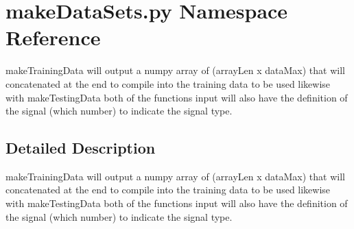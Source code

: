 \section{make\+Data\+Sets.\+py Namespace Reference}
\label{namespacemake_data_sets_1_1py}


make\+Training\+Data will output a numpy array of (array\+Len x data\+Max) that will concatenated at the end to compile into the training data to be used likewise with make\+Testing\+Data both of the functions input will also have the definition of the signal (which number) to indicate the signal type.  




\subsection{Detailed Description}
make\+Training\+Data will output a numpy array of (array\+Len x data\+Max) that will concatenated at the end to compile into the training data to be used likewise with make\+Testing\+Data both of the functions input will also have the definition of the signal (which number) to indicate the signal type. 

